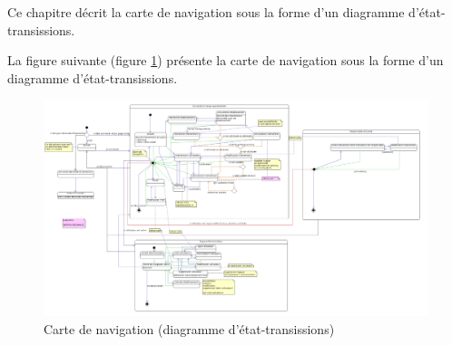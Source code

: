 Ce chapitre décrit la carte de navigation sous la forme d'un diagramme d'état-transissions.

La figure suivante (figure \ref{diagrammeEtatTrans}) présente la carte de navigation sous la forme d'un diagramme d'état-transissions.
\begin{figure}[H]
	\centering
	\includegraphics[scale=0.20]{images/diagrammeEtatsTransitions/carteDeNavigation.png}
	\caption{Carte de navigation (diagramme d'état-transissions)}
	\label{diagrammeEtatTrans}
\end{figure}